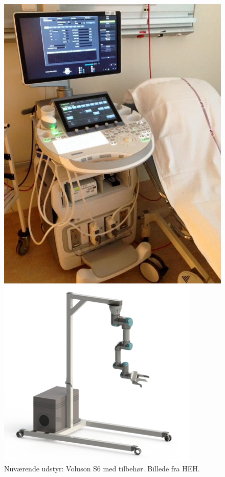 \begin{figure}[H]
	\begin{minipage}{0.45\textwidth}
		\centering
		\includegraphics[width=\textwidth]{Figurer/udstyrHorsens.jpg}
		\caption{Nuværende udstyr: Voluson S6 med tilbehør. Billede fra HEH.}
		\label{udstyrHorsens}
	\end{minipage}
	\hspace{0.02\textwidth}
	\begin{minipage}{0.55\textwidth}
		\centering
		\includegraphics[width=\textwidth]{Figurer/StativMedUR3Render.png}

\end{minipage}
\end{figure}
